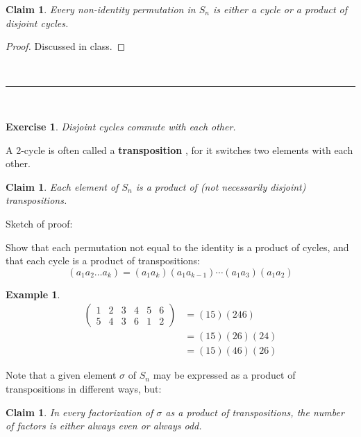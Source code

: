 \documentclass[a4paper,12pt]{report}
\newcommand{\class}[2]{#2}
\newcounter{statement}
\numberwithin{statement}{chapter}
\newtheorem{claim}[statement]{Claim}
\newtheorem{eg}[statement]{\bf Example}
\newtheorem{ex}[statement]{\bf Exercise}
\numberwithin{equation}{chapter}
\numberwithin{section}{chapter}
\numberwithin{subsection}{section}
\begin{document}
\begin{claim}
Every non-identity permutation in $S_n$ is either a cycle or a product of disjoint cycles.
\end{claim}
\begin{proof}
Discussed in class.
\end{proof}




\quad\\\hrule
\quad\\

\begin{ex}

Disjoint cycles commute with each other.

\end{ex}




A 2-cycle is often called a  {\bf transposition} ,
for it switches two elements with each other.



\begin{claim}
Each element of $S_n$ is a product of (not necessarily disjoint) transpositions.
\end{claim}



Sketch of proof:


Show that each permutation not equal to the identity is a product of cycles,
and that each cycle is a product of transpositions:
\[
(a_1a_2\ldots a_k) = (a_1 a_k) (a_1 a_{k - 1})\cdots(a_1 a_3)(a_1 a_2)
\]

\begin{eg}


\[
\begin{split}
\left(
\begin{matrix}
1&2&3&4&5&6\\
5&4&3&6&1&2
\end{matrix}
\right) &=
\class{steps1 steps}{(15)(246)}
\\&
\class{steps1 steps}{= (15)(26)(24)}
\\&
\class{steps1 steps}{ = (15)(46)(26)}
\end{split}
\]


\end{eg}




Note that a given element $\sigma$ of $S_n$
may be expressed as a product of transpositions in different ways,
but:
\begin{claim}
In every factorization of $\sigma$ as a product of transpositions,
the number of factors is either always even or always odd.
\end{claim}
\end{document}
